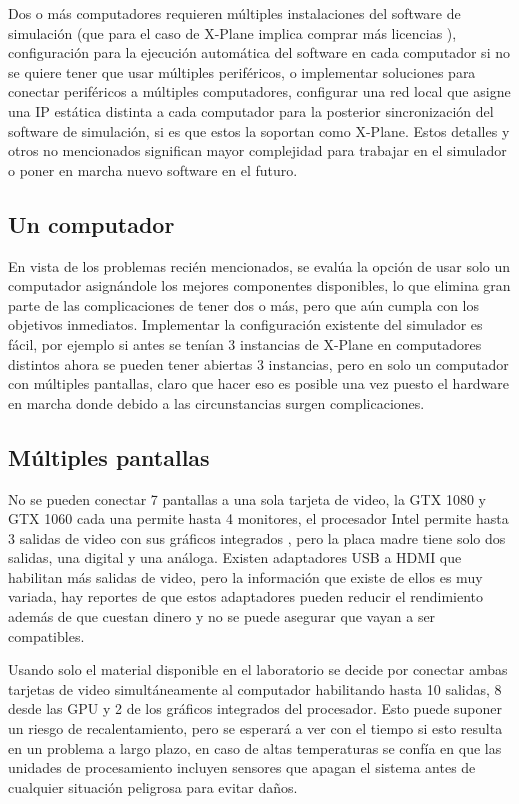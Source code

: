 Dos o más computadores requieren múltiples instalaciones del software de simulación (que para el caso de X-Plane implica comprar más licencias \cite{licencias}), configuración para la ejecución automática del software en cada computador si no se quiere tener que usar múltiples periféricos, o implementar soluciones para conectar periféricos a múltiples computadores, configurar una red local que asigne una IP estática distinta a cada computador para la posterior sincronización del software de simulación, si es que estos la soportan como X-Plane. Estos detalles y otros no mencionados significan mayor complejidad para trabajar en el simulador o poner en marcha nuevo software en el futuro.

\subsection{Un computador}

En vista de los problemas recién mencionados, se evalúa la opción de usar solo un computador asignándole los mejores componentes disponibles, lo que elimina gran parte de las complicaciones de tener dos o más, pero que aún cumpla con los objetivos inmediatos. Implementar la configuración existente del simulador es fácil, por ejemplo si antes se tenían 3 instancias de X-Plane en computadores distintos ahora se pueden tener abiertas 3 instancias, pero en solo un computador con múltiples pantallas, claro que hacer eso es posible una vez puesto el hardware en marcha donde debido a las circunstancias surgen complicaciones.

\subsection{Múltiples pantallas}

No se pueden conectar 7 pantallas a una sola tarjeta de video, la GTX 1080 y GTX 1060 cada una permite hasta 4 monitores, el procesador Intel permite hasta 3 salidas de video con sus gráficos integrados \cite{i7-3770k}, pero la placa madre tiene solo dos salidas, una digital y una análoga. Existen adaptadores USB a HDMI que habilitan más salidas de video, pero la información que existe de ellos es muy variada, hay reportes de que estos adaptadores pueden reducir el rendimiento además de que cuestan dinero y no se puede asegurar que vayan a ser compatibles.

Usando solo el material disponible en el laboratorio se decide por conectar ambas tarjetas de video simultáneamente al computador habilitando hasta 10 salidas, 8 desde las GPU y 2 de los gráficos integrados del procesador. Esto puede suponer un riesgo de recalentamiento, pero se esperará a ver con el tiempo si esto resulta en un problema a largo plazo, en caso de altas temperaturas se confía en que las unidades de procesamiento incluyen sensores que apagan el sistema antes de cualquier situación peligrosa para evitar daños.

